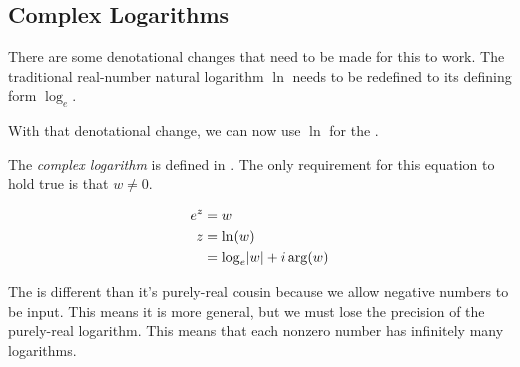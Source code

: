 \subsection{Complex Logarithms}\label{subsec:Complex_Logarithms}
There are some denotational changes that need to be made for this to work.
The traditional real-number natural logarithm $\ln$ needs to be redefined to its defining form $\log_{e}$.

With that denotational change, we can now use $\ln$ for the .

\begin{definition}\label{def:Complex_Logarithm}
  The \emph{complex logarithm} is defined in .
  The only requirement for this equation to hold true is that $w \neq 0$.

  \begin{equation}\label{eq:Complex_Logarithm}
    \begin{aligned}
      e^{z} &= w \\
      z &= \ln(w) \\
      &= \log_{e} \lvert w \rvert + i \arg(w)
    \end{aligned}
  \end{equation}

  \begin{remark}
    The  is different than it's purely-real cousin because we allow negative numbers to be input.
    This means it is more general, but we must lose the precision of the purely-real logarithm.
    This means that each nonzero number has infinitely many logarithms.
  \end{remark}
\end{definition}


